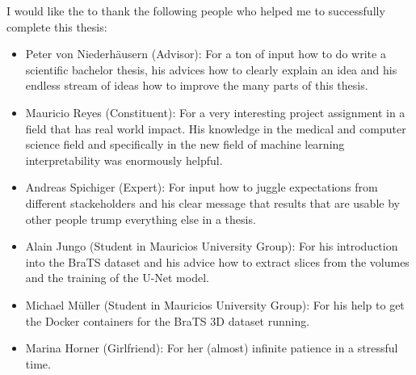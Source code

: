 I would like the to thank the following people who helped me to successfully complete this thesis:

\begin{itemize}
    \item Peter von Niederhäusern (Advisor): For a ton of input how to do write a scientific bachelor thesis, his advices how to clearly explain an idea and his endless stream of ideas how to improve the many parts of this thesis.
    \item Mauricio Reyes (Constituent): For a very interesting project assignment in a field that has real world impact. His knowledge in the medical and computer science field and specifically in the new field of machine learning interpretability was enormously helpful.
    \item Andreas Spichiger (Expert): For input how to juggle expectations from different stackeholders and his clear message that results that are usable by other people trump everything else in a thesis.
    \item Alain Jungo (Student in Mauricios University Group): For his introduction into the BraTS dataset and his advice how to extract slices from the volumes and the training of the U-Net model.
    \item Michael Müller (Student in Mauricios University Group): For his help to get the Docker containers for the BraTS 3D dataset running.
    \item Marina Horner (Girlfriend): For her (almost) infinite patience in a stressful time.
\end{itemize}
